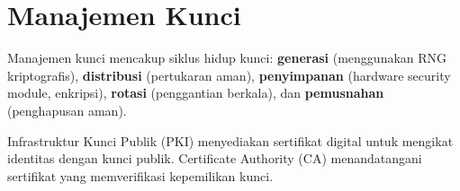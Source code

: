 \section{Manajemen Kunci}

Manajemen kunci mencakup siklus hidup kunci: \textbf{generasi} (menggunakan RNG kriptografis), \textbf{distribusi} (pertukaran aman), \textbf{penyimpanan} (hardware security module, enkripsi), \textbf{rotasi} (penggantian berkala), dan \textbf{pemusnahan} (penghapusan aman).

Infrastruktur Kunci Publik (PKI) menyediakan sertifikat digital untuk mengikat identitas dengan kunci publik. Certificate Authority (CA) menandatangani sertifikat yang memverifikasi kepemilikan kunci.

